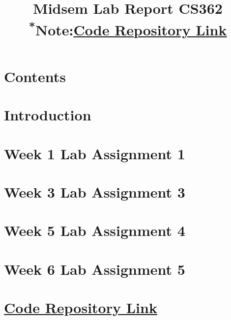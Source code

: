 \documentclass[conference]{IEEEtran}
\begin{document}
\title{Midsem Lab Report CS362\\
{{\footnotesize \textsuperscript{*}Note:\textbf{\href{https://github.com/darshh311/CS362_lab}{Code Repository Link}}}}
}

\author{
\and
{}
}
\maketitle


\section*{Contents}
\section*{\textbf{Introduction}}
\section*{\textbf{Week 1 Lab Assignment 1}}
\section*{\textbf{Week 3 Lab Assignment 3}}
\section*{\textbf{Week 5 Lab Assignment 4}}
\section*{\textbf{Week 6 Lab Assignment 5}}
\section*{\textbf{\href{https://github.com/darshh311/CS362_lab}{Code Repository Link}}
}
\end{document}
